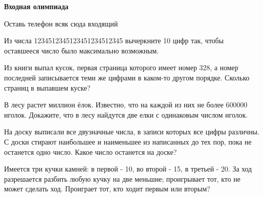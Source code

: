 \centerline{\bf \Huge Входная олимпиада}


\begin{flushright}
        \scriptsize{Оставь телефон всяк сюда входящий}
\end{flushright}


 Из числа 1234512345123451234512345 вычеркните 10 цифр так, чтобы оставшееся число было максимально возможным.

 Из книги выпал кусок, первая страница которого имеет номер 328, а номер последней записывается теми же цифрами в каком-то другом порядке. Сколько страниц в выпавшем куске?

 В лесу растет миллион ёлок. Известно, что на каждой из них не более 600000 иголок. Докажите, что в лесу найдутся две елки с одинаковым числом иголок. 

 На доску выписали все двузначные числа, в записи которых все цифры различны. С доски стирают наибольшее и наименьшее из написанных до тех пор, пока не останется одно число. Какое число 
останется на доске?  

 Имеется три кучки камней: в первой - 10, во второй - 15, в третьей - 20. За ход разрешается разбить любую кучку на две меньшие; проигрывает тот, кто не может сделать ход. Проиграет тот, кто ходит первым или вторым?


